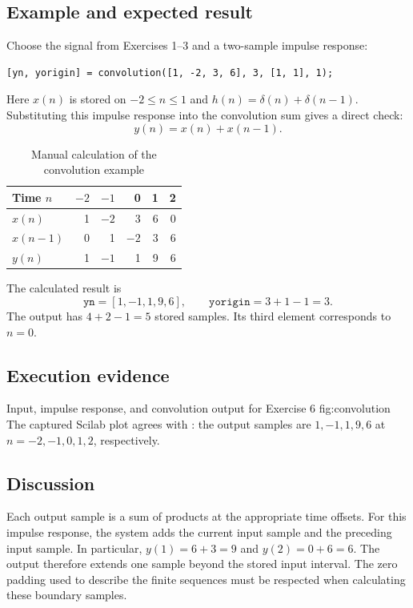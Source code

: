\subsection{Example and expected result}
Choose the signal from Exercises 1--3 and a two-sample impulse response:
\begin{lstlisting}[numbers=none]
[yn, yorigin] = convolution([1, -2, 3, 6], 3, [1, 1], 1);
\end{lstlisting}
Here $x(n)$ is stored on $-2\leq n\leq1$ and
$h(n)=\delta(n)+\delta(n-1)$. Substituting this impulse response
into the convolution sum gives a direct check:
\begin{equation}
  y(n)=x(n)+x(n-1).
\end{equation}
\begin{table}[H]
  \centering
  \caption{Manual calculation of the convolution example}
  \label{tab:convolution}
  \begin{tabular}{lrrrrr}
    \toprule
    Time $n$ & $-2$ & $-1$ & 0 & 1 & 2\\
    \midrule
    $x(n)$ & 1 & $-2$ & 3 & 6 & 0\\
    $x(n-1)$ & 0 & 1 & $-2$ & 3 & 6\\
    $y(n)$ & 1 & $-1$ & 1 & 9 & 6\\
    \bottomrule
  \end{tabular}
\end{table}
The calculated result is
\[
  \texttt{yn}=[1,-1,1,9,6],\qquad
  \texttt{yorigin}=3+1-1=3.
\]
The output has $4+2-1=5$ stored samples. Its third element corresponds
to $n=0$.

\subsection{Execution evidence}
  {Input, impulse response, and convolution output for Exercise 6}
  {fig:convolution}
The captured Scilab plot agrees with : the output
samples are $1,-1,1,9,6$ at $n=-2,-1,0,1,2$, respectively.

\subsection{Discussion}
Each output sample is a sum of products at the appropriate time offsets.
For this impulse response, the system adds the current input sample and
the preceding input sample. In particular, $y(1)=6+3=9$ and
$y(2)=0+6=6$. The output therefore extends one sample beyond the
stored input interval. The zero padding used to describe the finite
sequences must be respected when calculating these boundary samples.
